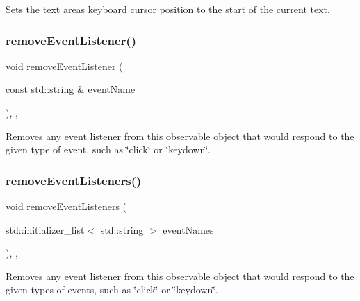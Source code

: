 Sets the text area\textquotesingle{}s keyboard cursor position to the start of the current text. 

\mbox{\label{classGObservable_acbcf1ed3a851ad8a3c17ef38d86b481d}} 
\subsubsection{\texorpdfstring{remove\+Event\+Listener()}{removeEventListener()}}
{\footnotesize\ttfamily void remove\+Event\+Listener (\begin{DoxyParamCaption}\item[{const std\+::string \&}]{event\+Name }\end{DoxyParamCaption})\hspace{0.3cm}{\ttfamily [protected]}, {\ttfamily [virtual]}, {\ttfamily [inherited]}}



Removes any event listener from this observable object that would respond to the given type of event, such as \char`\"{}click\char`\"{} or \char`\"{}keydown\char`\"{}. 

\mbox{\label{classGObservable_af51cc35c29a1bd1908609d432decdbb6}} 
\subsubsection{\texorpdfstring{remove\+Event\+Listeners()}{removeEventListeners()}}
{\footnotesize\ttfamily void remove\+Event\+Listeners (\begin{DoxyParamCaption}\item[{std\+::initializer\+\_\+list$<$ std\+::string $>$}]{event\+Names }\end{DoxyParamCaption})\hspace{0.3cm}{\ttfamily [protected]}, {\ttfamily [virtual]}, {\ttfamily [inherited]}}



Removes any event listener from this observable object that would respond to the given types of events, such as \char`\"{}click\char`\"{} or \char`\"{}keydown\char`\"{}. 

